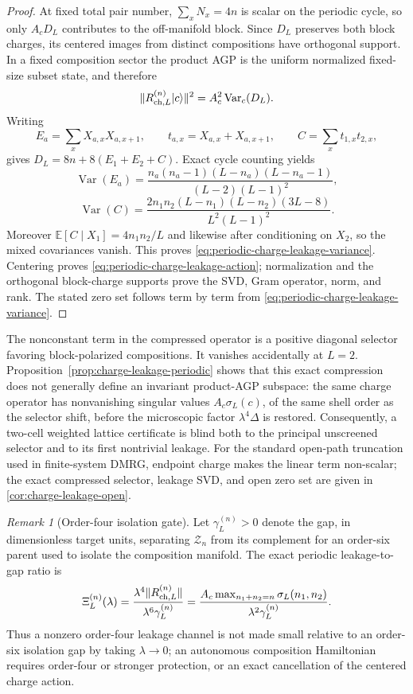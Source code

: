 \documentclass[11pt]{article}
\theoremstyle{definition}
\theoremstyle{remark}
\newtheorem{remark}[theorem]{Remark}
\newcommand{\ket}[1]{\lvert #1\rangle}
\newcommand{\norm}[1]{\lVert #1\rVert}
\begin{document}
\begin{proof}
At fixed total pair number, $\sum_x N_x=4n$ is scalar on the periodic cycle, so
only $A_c D_L$ contributes to the off-manifold block.  Since $D_L$ preserves both
block charges, its centered images from distinct compositions have orthogonal
support.  In a fixed composition sector the product AGP is the uniform
normalized fixed-size subset state, and therefore
\[
 \norm{R_{{\rm ch},L}^{(n)}\ket c}^2
 =A_c^2\operatorname{Var}_c(D_L).
\]
Writing
\[
 E_a=\sum_x X_{a,x}X_{a,x+1},\qquad
 t_{a,x}=X_{a,x}+X_{a,x+1},\qquad
 C=\sum_x t_{1,x}t_{2,x},
\]
gives $D_L=8n+8(E_1+E_2+C)$.  Exact cycle counting yields
\[
 \operatorname{Var}(E_a)=
 \frac{n_a(n_a-1)(L-n_a)(L-n_a-1)}{(L-2)(L-1)^2},
\]
\[
 \operatorname{Var}(C)=
 \frac{2n_1n_2(L-n_1)(L-n_2)(3L-8)}{L^2(L-1)^2}.
\]
Moreover $\mathbb E[C\mid X_1]=4n_1n_2/L$ and likewise after conditioning on
$X_2$, so the mixed covariances vanish.  This proves
\eqref{eq:periodic-charge-leakage-variance}.  Centering proves
\eqref{eq:periodic-charge-leakage-action}; normalization and the orthogonal
block-charge supports prove the SVD, Gram operator, norm, and rank.  The stated
zero set follows term by term from \eqref{eq:periodic-charge-leakage-variance}.
\end{proof}

The nonconstant term in the compressed operator is a positive diagonal selector favoring block-polarized compositions.  It vanishes accidentally at $L=2$.  Proposition~\ref{prop:charge-leakage-periodic} shows that this exact compression does not generally define an invariant product-AGP subspace: the same charge operator has nonvanishing singular values $A_c\sigma_L(c)$, of the same shell order as the selector shift, before the microscopic factor $\lambda^4\Delta$ is restored.  Consequently, a two-cell weighted lattice certificate is blind both to the principal unscreened selector and to its first nontrivial leakage.
For the standard open-path truncation used in finite-system DMRG, endpoint charge makes the linear term non-scalar; the exact compressed selector, leakage SVD, and open zero set are given in \cref{cor:charge-leakage-open}.


\begin{remark}[Order-four isolation gate]
\label{rem:order-four-isolation-gate}
Let $\gamma_L^{(n)}>0$ denote the gap, in dimensionless target units, separating
$\mathcal Z_n$ from its complement for an order-six parent used to isolate the
composition manifold.  The exact periodic leakage-to-gap ratio is
\begin{equation}
 \Xi_L^{(n)}(\lambda)
 =\frac{\lambda^4\norm{R_{{\rm ch},L}^{(n)}}}
 {\lambda^6\gamma_L^{(n)}}
 =\frac{A_c\max_{n_1+n_2=n}\sigma_L(n_1,n_2)}
 {\lambda^2\gamma_L^{(n)}}.
 \label{eq:unscreened-leakage-ratio}
\end{equation}
Thus a nonzero order-four leakage channel is not made small relative to an
order-six isolation gap by taking $\lambda\to0$; an autonomous composition
Hamiltonian requires order-four or stronger protection, or an exact cancellation
of the centered charge action.
\end{remark}
\end{document}
